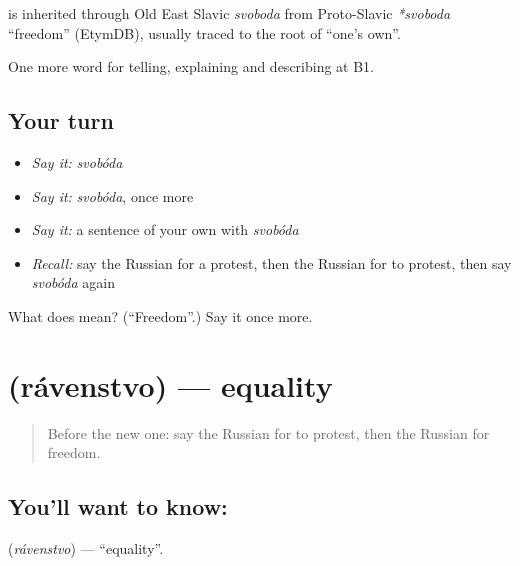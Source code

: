 \begin{cousinweb}
\textbf{} is inherited through Old East Slavic \emph{svoboda} from Proto-Slavic \emph{*svoboda} \textquotedblleft{}freedom\textquotedblright{} (EtymDB), usually traced to the root of \emph{} \textquotedblleft{}one’s own\textquotedblright{}.
\end{cousinweb}

\begin{grammarlens}[title={What you've built}]
One more word for telling, explaining and describing at B1.
\end{grammarlens}

\subsection*{Your turn}
\begin{itemize}
\raggedright
  \item \emph{Say it:} \emph{svobóda}
  \item \emph{Say it:} \emph{svobóda}, once more
  \item \emph{Say it:} a sentence of your own with \emph{svobóda}
  \item \emph{Recall:} say the Russian for a protest, then the Russian for to protest, then say \emph{svobóda} again
\end{itemize}

\begin{tcolorbox}[breakable,colback=teal!4,colframe=teal!35!black,title={Before you move on}]
What does  mean? (\textquotedblleft{}Freedom\textquotedblright{}.) Say it once more.
\end{tcolorbox}
\section[\texorpdfstring{\ru{равенство} (rávenstvo)}{равенство (rávenstvo)}]{ (rávenstvo) — equality}

\label{lesson:RU-C367-ravenstvo}



\begin{quote}
Before the new one: say the Russian for to protest, then the Russian for freedom.
\end{quote}

\subsection*{You'll want to know: }
\textbf{} (\emph{rávenstvo}) — \textquotedblleft{}equality\textquotedblright{}.

